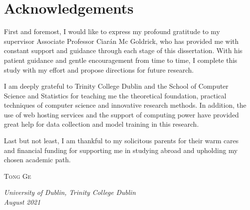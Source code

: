 \chapter{Acknowledgements}
{
\linespread{1.3}
\selectfont
First and foremost, I would like to express my profound gratitude to my supervisor Associate Professor Ciarán Mc Goldrick, who has provided me with constant support and guidance through each stage of this dissertation. 
With his patient guidance and gentle encouragement from time to time, I complete this study with my effort and propose directions for future research.

I am deeply grateful to Trinity College Dublin and the School of Computer Science and Statistics for teaching me the theoretical foundation, practical techniques of computer science and innovative research methods. 
In addition, the use of web hosting services and the support of computing power have provided great help for data collection and model training in this research.

Last but not least, I am thankful to my solicitous parents for their warm cares and financial funding for supporting me in studying abroad and upholding my chosen academic path.

\vspace{1.2cm}
\raggedleft \textsc{\large Tong Ge} \\[10mm]

\raggedright \textit{University of Dublin, Trinity College Dublin \\
August 2021}
}
\clearpage